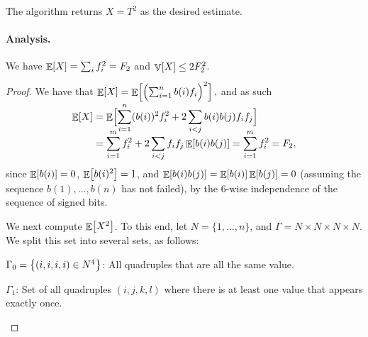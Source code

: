 
The algorithm returns $X = T^2$ as the desired estimate.

\paragraph*{Analysis.}
\begin{lemma}
    We have $\mathop{\mathbb{E}}\!\left[ {X} \right] = \sum_i f_i^2 = F_2$ and
    $\mathop{\mathbb{V}}\!\left[ {X} \right] \leq 2 F_2^2$.
\end{lemma}
\begin{proof}
    We have that
    \begin{math}
        \Ex{X}
        =
        \Ex{\smash{ \Bigl(  \sum_{i=1}^n b(i) \frq_i \Bigr)^2}
           \Bigr.},%
    \end{math}
    and as such
    \begin{align*}
        \Ex{X}%
        &= %
        \Ex{\Bigr. \smash{  \sum_{i=1}^n (b(i))^2 \frq_i^2 %
              + 2\sum_{i < j} b(i) b(j) \frq_i \frq_j}}%
        \\&= %
        \sum_{i=1}^m  \frq_i^2 +  2\sum_{i < j}  \frq_i \frq_j \Ex{   %
           b(i) b(j)}%
        =%
        \sum_{i=1}^m  \frq_i^2
        =%
        \Frq_2,
    \end{align*}
    since $\mathop{\mathbb{E}}\!\left[ {b(i)} \right] = 0$, $\mathop{\mathbb{E}}\!\left[ {b(i)^2} \right] =1$, and
    $\mathop{\mathbb{E}}\!\left[ {b(i)b(j) } \right] = \mathop{\mathbb{E}}\!\left[ {b(i) } \right] \mathop{\mathbb{E}}\!\left[ {b(j)} \right] = 0$ (assuming the sequence
    $b(1), \ldots, b(n)$ has not failed), by the $6$-wise independence
    of the sequence of signed bits.

    \medskip%
    We next compute $\mathop{\mathbb{E}}\!\left[ {X^2} \right]$. To this end, let
    $N = \{1,\ldots, n\}$, and $\Gamma = N\times N \times N \times
    N$. We split this set into several sets, as follows:
    \begin{compactenumi}
        \smallskip%
        \item $\Gamma_0 = \left\{ {(i,i,i,i) \in N^4} \right\}$: All quadruples
        that are all the same value.

        \smallskip%
        \item $\Gamma_{1}$: Set of all quadruples $(i,j,k,l)$ where
        there is at least one value that appears exactly once.



\end{compactenumi}
\end{proof}
